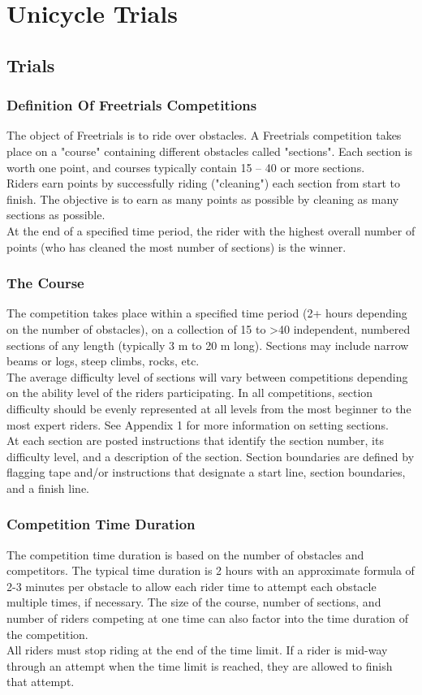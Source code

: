 \part{Unicycle Trials}
\parttoc
\chapter{Trials}
\section{Definition Of Freetrials Competitions}
The object of Freetrials is to ride over obstacles. A Freetrials competition takes place on a "course" containing different
obstacles called "sections". Each section is worth one point, and courses typically contain 15 – 40 or more sections.\\
Riders earn points by successfully riding ("cleaning") each section from start to finish. The objective is to earn as many
points as possible by cleaning as many sections as possible.\\
At the end of a specified time period, the rider with the highest overall number of points (who has cleaned the most
number of sections) is the winner.\\
\section{The Course}
The competition takes place within a specified time period (2+ hours depending on the number of obstacles), on a
collection of 15 to >40 independent, numbered sections of any length (typically 3 m to 20 m long). Sections may include
narrow beams or logs, steep climbs, rocks, etc.\\
The average difficulty level of sections will vary between competitions depending on the ability level of the riders
participating. In all competitions, section difficulty should be evenly represented at all levels from the most beginner to the
most expert riders. See Appendix 1 for more information on setting sections.\\
At each section are posted instructions that identify the section number, its difficulty level, and a description of the section.
Section boundaries are defined by flagging tape and/or instructions that designate a start line, section boundaries, and a
finish line.
\section{Competition Time Duration}
The competition time duration is based on the number of obstacles and competitors. The typical time duration is 2 hours
with an approximate formula of 2-3 minutes per obstacle to allow each rider time to attempt each obstacle multiple times,
if necessary. The size of the course, number of sections, and number of riders competing at one time can also factor into
the time duration of the competition.\\
All riders must stop riding at the end of the time limit. If a rider is mid-way through an attempt when the time limit is
reached, they are allowed to finish that attempt.
